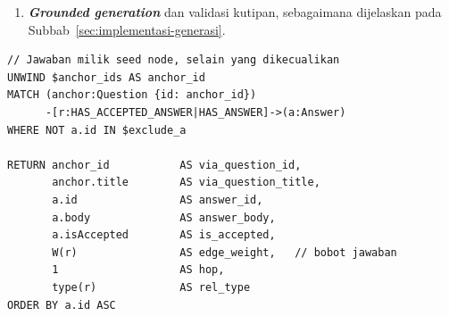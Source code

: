 \begin{enumerate}
    \begin{enumerate}[label=\alph*)]
        \item \emph{Pool.} Kandidat awal ($K_B$ jawaban dengan $w_{qq'}=1$), hasil \emph{traversal}, dan hasil ekspansi digabung.
        \item \emph{Deduplikasi.} Apabila jawaban yang sama dicapai melalui beberapa jalur, hanya kemunculan dengan bobot jalur tertinggi yang dipertahankan, dan jika sama, yang ditemukan lebih dulu.
        \item \emph{Skor akhir.} Kemiripan $\mathrm{sim}(q,c)$ dihitung terhadap teks kandidat persis seperti yang ditampilkan kepada LLM, yaitu \texttt{Q: \textless judul\textgreater} diikuti \texttt{A: \textless jawaban\textgreater} yang dipotong 400 token, lalu dinormalisasi \emph{min-max} atas seluruh \emph{pool} satu pertanyaan. Skor akhir dihitung menurut Persamaan~\eqref{eq:final-score}.
        \item \emph{Pemilihan.} Seluruh kandidat diurutkan berdasarkan skor akhir secara menurun. Jika terdapat kandidat dengan skor yang sama, identitas jawaban digunakan sebagai pemutus seri. Lima kandidat dengan skor tertinggi dipilih sebagai \emph{unified context window}, dengan masing-masing kandidat diberi label \texttt{[SO-\textless id pertanyaan\textgreater]}.
    \end{enumerate}
    \item \textbf{\emph{Grounded generation}} dan validasi kutipan, sebagaimana dijelaskan pada Subbab~\ref{sec:implementasi-generasi}.
\end{enumerate}

\begin{lstlisting}[caption={Kueri Cypher \emph{traversal} satu \emph{hop} pada Kondisi C. \texttt{W(r)} adalah bobot jawaban dari tipe sisi \texttt{r} dan skor jawaban (Tabel~\ref{tab:bobot-jawaban}).}, label={lst:cypher-1hop}, frame=single, captionpos=t, language={}, basicstyle=\ttfamily\scriptsize]
// Jawaban milik seed node, selain yang dikecualikan
UNWIND $anchor_ids AS anchor_id
MATCH (anchor:Question {id: anchor_id})
      -[r:HAS_ACCEPTED_ANSWER|HAS_ANSWER]->(a:Answer)
WHERE NOT a.id IN $exclude_a

RETURN anchor_id           AS via_question_id,
       anchor.title        AS via_question_title,
       a.id                AS answer_id,
       a.body              AS answer_body,
       a.isAccepted        AS is_accepted,
       W(r)                AS edge_weight,   // bobot jawaban
       1                   AS hop,
       type(r)             AS rel_type
ORDER BY a.id ASC
\end{lstlisting}

